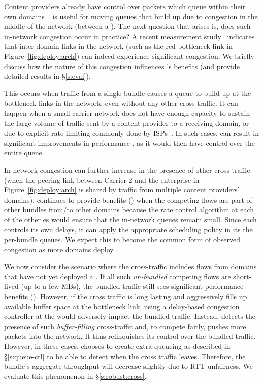 Content providers already have control over packets which queue within their own domains~\cite{swan, b4, bwe}. \name is useful for moving queues that build up due to congestion in the middle of the network (\ie between a \pair).
The next question that arises is, does such in-network congestion occur in practice? A recent measurement study~\cite{inferring-interdomain-congestion} indicates that inter-domain links in the network (such as the red bottleneck link in Figure~\ref{fig:deploy:arch}) can indeed experience significant congestion. 
We briefly discuss how the nature of this congestion influences \name's benefits (and provide detailed results in \S\ref{s:eval}).

 This occurs when traffic from a single bundle causes a queue to build up at the bottleneck links in the network, even without any other cross-traffic. It can happen when a small carrier network does not have enough capacity to sustain the large volume of traffic sent by a content provider to a receiving domain, or due to explicit rate limiting commonly done by ISPs~\cite{isp-throttle-1, isp-throttle-2, isp-throttle-3}. In such cases, \name can result in
significant improvements in performance , as it would then have control over the entire queue. 

 In-network congestion can further increase in the presence of other cross-traffic (\eg when the peering link between Carrier 2 and the enterprise in Figure~\ref{fig:deploy:arch} is shared by traffic from multiple content providers' domains). 
\name continues to provide benefits () when the competing flows are part of other bundles from/to other domains because the rate control algorithm at each of the other {\inbox}es would ensure that the in-network queues remain small. Since each \inbox controls its own delays, it can apply the appropriate scheduling policy in its the per-bundle queues.
We expect this to become the common form of observed congestion as more domains deploy \name. 

 We now consider the scenario where the cross-traffic includes flows from domains that have not yet deployed a \name. If all such \emph{un-bundled} competing flows are short-lived (up to a few MBs), the bundled traffic still sees significant performance benefits (). 
However, if the cross traffic is long lasting and aggressively fills up available buffer space at the bottleneck link, using a delay-based congestion controller  at the \name would adversely impact the bundled traffic. 
Instead, \name detects the presence of such \emph{buffer-filling} cross-traffic and, to compete fairly, pushes more packets into the network. 
It thus relinquishes its control over the bundled traffic.
However, in these cases, \name chooses to create extra queueing as described in \S\ref{s:queue-ctl} to be able to detect when the cross traffic leaves.
Therefore, the bundle's aggregate throughput will decrease slightly due to RTT unfairness.
We evaluate this phenomenon in \S\ref{s:robust:cross}.

